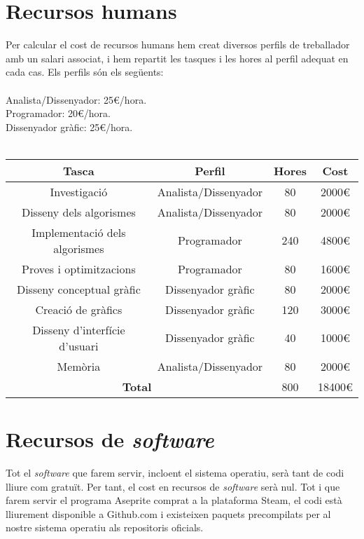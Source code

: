 \section{Recursos humans}
Per calcular el cost de recursos humans hem creat diversos perfils de treballador amb un salari associat, i hem repartit les tasques i les hores al perfil adequat en cada cas.
Els perfils són els següents:
\\ \\
Analista/Dissenyador: 25€/hora. \\
Programador: 20€/hora. \\
Dissenyador gràfic: 25€/hora. \\
\\
\begin{center}
  \begin{tabular}{|c|c|c|c|}
    \hline
    Tasca & Perfil & Hores & Cost \\
    \hline \hline
    Investigació & Analista/Dissenyador & 80 & 2000€ \\ \hline
    Disseny dels algorismes & Analista/Dissenyador & 80 & 2000€ \\ \hline
    Implementació dels algorismes & Programador & 240 & 4800€ \\ \hline 
    Proves i optimitzacions & Programador & 80 & 1600€ \\ \hline
    Disseny conceptual gràfic & Dissenyador gràfic & 80 & 2000€ \\ \hline
    Creació de gràfics & Dissenyador gràfic & 120 & 3000€ \\ \hline
    Disseny d'interfície d'usuari & Dissenyador gràfic & 40 & 1000€ \\ \hline
    Memòria & Analista/Dissenyador & 80 & 2000€ \\ \hline
    \hline
    \multicolumn{2}{|c|}{\textbf{Total}} & 800 & 18400€ \\ \hline
  \end{tabular}
\end{center}
\section{Recursos de \textit{software}}
Tot el \textit{software} que farem servir, incloent el sistema operatiu, serà tant de codi lliure com gratuït. Per tant, el cost en recursos de \textit{software} serà nul.
Tot i que farem servir el programa Aseprite comprat a la plataforma Steam, el codi està lliurement disponible a Github.com i existeixen paquets precompilats per al nostre sistema operatiu als repositoris oficials.
